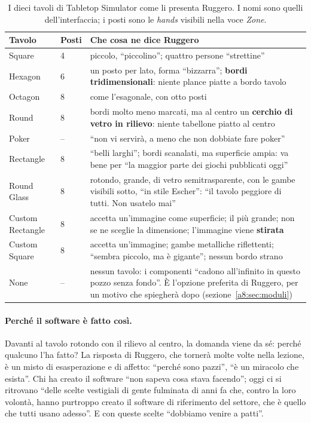 \begin{table}[htbp]
\centering
\small
\begin{tabular}{@{}p{2.7cm}p{1.2cm}p{8.6cm}@{}}
\toprule
\textbf{Tavolo} & \textbf{Posti} & \textbf{Che cosa ne dice Ruggero} \\
\midrule
Square & 4 & piccolo, ``piccolino''; quattro persone ``strettine'' \\
Hexagon & 6 & un posto per lato, forma ``bizzarra''; \textbf{bordi
tridimensionali}: niente plance piatte a bordo tavolo \\
Octagon & 8 & come l'esagonale, con otto posti \\
Round & 8 & bordi molto meno marcati, ma al centro un \textbf{cerchio di vetro in
rilievo}: niente tabellone piatto al centro \\
Poker & -- & ``non vi servirà, a meno che non dobbiate fare poker'' \\
Rectangle & 8 & ``belli larghi''; bordi scanalati, ma superficie ampia: va bene per
``la maggior parte dei giochi pubblicati oggi'' \\
Round Glass & 8 & rotondo, grande, di vetro semitrasparente, con le gambe visibili
sotto, ``in stile Escher'': ``il tavolo peggiore di tutti. Non usatelo mai'' \\
Custom Rectangle & 8 & accetta un'immagine come superficie; il più grande; non se ne
sceglie la dimensione; l'immagine viene \textbf{stirata} \\
Custom Square & 8 & accetta un'immagine; gambe metalliche riflettenti; ``sembra
piccolo, ma è gigante''; nessun bordo strano \\
None & -- & nessun tavolo: i componenti ``cadono all'infinito in questo pozzo senza
fondo''. È l'opzione preferita di Ruggero, per un motivo che spiegherà dopo
(sezione~\ref{a8:sec:moduli}) \\
\bottomrule
\end{tabular}
\caption{I dieci tavoli di Tabletop Simulator come li presenta Ruggero. I nomi sono
quelli dell'interfaccia; i posti sono le \emph{hands} visibili nella voce
\emph{Zone}\protect\footnotemark.}
\label{a8:tab:tavoli}
\end{table}

\paragraph{Perché il software è fatto così.} Davanti al tavolo rotondo con il rilievo
al centro, la domanda viene da sé: perché qualcuno l'ha fatto? La risposta di Ruggero,
che tornerà molte volte nella lezione, è un misto di esasperazione e di affetto:
``perché sono pazzi'', ``è un miracolo che esista''. Chi ha creato il software ``non
sapeva cosa stava facendo''; oggi ci si ritrovano ``delle scelte vestigiali di gente
fulminata di anni fa che, contro la loro volontà, hanno purtroppo creato il software
di riferimento del settore, che è quello che tutti usano adesso''. E con queste scelte
``dobbiamo venire a patti''.

